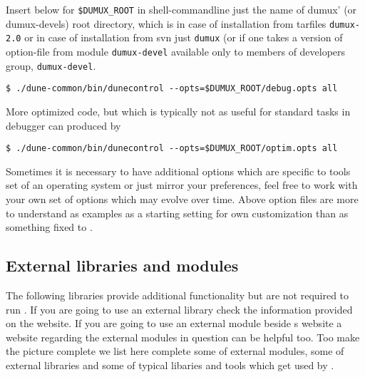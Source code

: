 Insert below for \verb+$DUMUX_ROOT+ in shell-commandline just the name of dumux' (or dumux-devels) root directory, which is in case of installation from tarfiles \texttt{dumux-2.0} or in case of installation from svn just \texttt{dumux} (or if one takes a version of option-file from module \texttt{dumux-devel} available only to members of \Dumux developers group, \texttt{dumux-devel}.

\begin{lstlisting}[style=Bash]
$ ./dune-common/bin/dunecontrol --opts=$DUMUX_ROOT/debug.opts all
\end{lstlisting}

More optimized code, but which is typically not as useful for standard tasks in debugger can produced by 

\begin{lstlisting}[style=Bash]
$ ./dune-common/bin/dunecontrol --opts=$DUMUX_ROOT/optim.opts all
\end{lstlisting}

Sometimes it is necessary to have additional options which are specific to tools set of an operating system or just mirror your preferences, feel free to work with your own set of options which may evolve over time. Above option files are more to understand as examples as a starting setting for own customization than as something fixed to \Dumux.

\subsection{External libraries and modules}

The following libraries provide additional functionality but are not required to run \Dumux. 
If you are going to use an external library check the information provided on the \Dune website. If you are going to use an external \Dune module beside {\Dune}s website a website regarding the external modules in question can be helpful too. Too make the picture complete we list here complete some of external modules, some of external libraries and some of typical libaries and tools which get used by \Dune.


